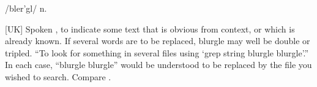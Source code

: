  /bler'gl/ n.

[UK] Spoken , to indicate some text that is
obvious from context, or which is already known. If several words are to be
replaced, blurgle may well be double or tripled. ``To look for something in
several files using `grep string blurgle blurgle'.'' In each case, ``blurgle
blurgle'' would be understood to be replaced by the file you wished to search.
Compare .

